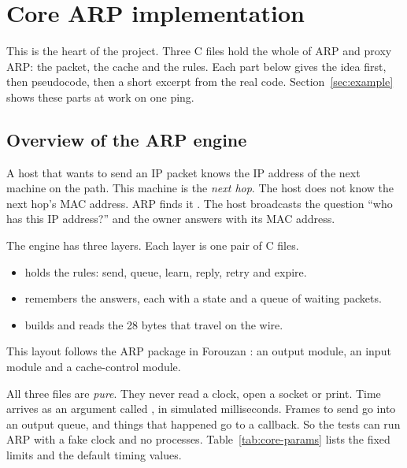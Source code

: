 \begingroup
{}
\section{Core ARP implementation}\label{sec:core}
This is the heart of the project. Three C files hold the whole of ARP and proxy ARP: the packet, the cache and the rules. Each part below gives the idea first, then pseudocode, then a short excerpt from the real code. Section~\ref{sec:example} shows these parts at work on one ping.

\subsection{Overview of the ARP engine}
A host that wants to send an IP packet knows the IP address of the next machine on the path. This machine is the \emph{next hop}. The host does not know the next hop's MAC address. ARP finds it \cite{rfc826}. The host broadcasts the question ``who has this IP address?'' and the owner answers with its MAC address.

The engine has three layers. Each layer is one pair of C files.
\begin{itemize}[nosep]
\item {} holds the rules: send, queue, learn, reply, retry and expire.
\item {} remembers the answers, each with a state and a queue of waiting packets.
\item {} builds and reads the 28 bytes that travel on the wire.
\end{itemize}
This layout follows the ARP package in Forouzan \cite{forouzan}: an output module, an input module and a cache-control module.

All three files are \emph{pure}. They never read a clock, open a socket or print. Time arrives as an argument called , in simulated milliseconds. Frames to send go into an output queue, and things that happened go to a callback. So the tests can run ARP with a fake clock and no processes. Table~\ref{tab:core-params} lists the fixed limits and the default timing values.

